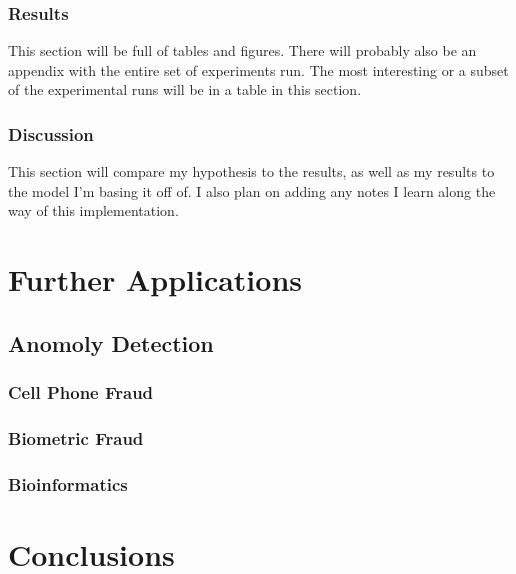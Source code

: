 \documentclass[midd]{thesis}
\begin{document}
\subsection{Results}

This section will be full of tables and figures. There will probably also be an appendix with the entire set of experiments run. The most interesting or a subset of the experimental runs will be in a table in this section.

\subsection{Discussion}

This section will compare my hypothesis to the results, as well as my results to the model I'm basing it off of. I also plan on adding any notes I learn along the way of this implementation.
\pagebreak
\chapter{Further Applications}


\section{Anomoly Detection}

\subsection{Cell Phone Fraud}

\subsection{Biometric Fraud}

\subsection{Bioinformatics}

\pagebreak
\chapter{Conclusions}




\end{document}
